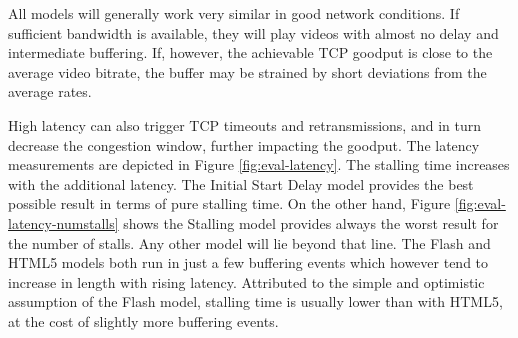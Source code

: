 All models will generally work very similar in good network conditions. If sufficient bandwidth is available, they will play videos with almost no delay and  intermediate buffering. If, however, the achievable TCP goodput is close to the average video bitrate, the buffer may be strained by short deviations from the average rates. %

High latency can also trigger TCP timeouts and retransmissions, and in turn decrease the congestion window, further impacting the goodput. The latency measurements are depicted in Figure \ref{fig:eval-latency}. The stalling time increases with the additional latency. The Initial Start Delay model provides the best possible result in terms of pure stalling time. On the other hand, Figure \ref{fig:eval-latency-numstalls} shows the Stalling model provides always the worst result for the number of stalls. Any other model will lie beyond that line. The Flash and HTML5 models both run in just a few buffering events which however tend to increase in length with rising latency. Attributed to the simple and optimistic assumption of the Flash model, stalling time is usually lower than with HTML5, at the cost of slightly more buffering events.
 

